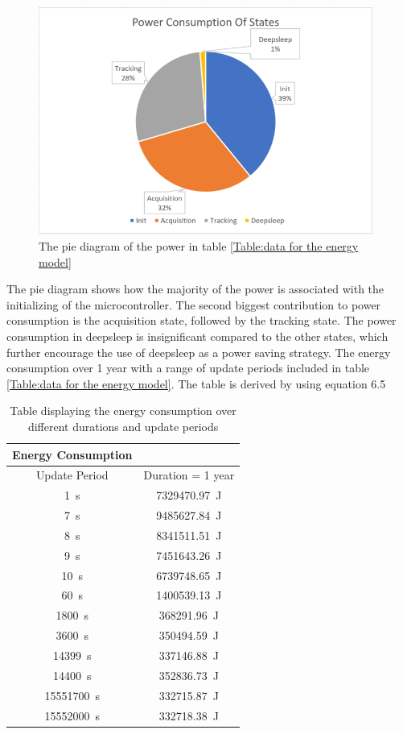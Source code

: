 \begin{figure}[H]
\centering
\includegraphics[height=7.5cm]{Project_Report/Images/Power.PNG}
\caption{The pie diagram of the power in table \ref{Table:data for the energy model}}
\label{fig:powerconsumption}
\end{figure}

The pie diagram shows how the majority of the power is associated with the initializing of the microcontroller. The second biggest contribution to power consumption is the acquisition state, followed by the tracking state. The power consumption in deepsleep is insignificant compared to the other states, which further encourage the use of deepsleep as a power saving strategy. The energy consumption over 1 year with a range of update periods included in table \ref{Table:data for the energy model}. The table is derived by using equation 6.5


\begin{table}[h!]
\begin{center}
 \begin{tabular}{||c c||} 
 \hline
 Energy Consumption & \\
 \hline
  Update Period & Duration = 1 year \\[0.5ex] 
 \hline\hline
  1 \,s & 7329470.97 \,J \\ 
 \hline
  7 \,s & 9485627.84 \,J \\
  \hline
  8 \,s & 8341511.51 \,J \\
  \hline
  9 \,s & 7451643.26 \,J \\
  \hline
  10 \,s & 6739748.65 \,J \\
 \hline
  60 \,s & 1400539.13 \,J \\
 \hline
  1800 \,s & 368291.96 \,J \\
  \hline
  3600 \,s & 350494.59 \,J \\
  \hline
  14399 \,s & 337146.88 \,J \\
  \hline
  14400 \,s & 352836.73 \,J \\
  \hline
  15551700 \,s & 332715.87 \,J \\
  \hline
  15552000 \,s & 332718.38 \,J \\[1ex]
 \hline
\end{tabular}
\end{center}
\caption{Table displaying the energy consumption over different durations and update periods}
\label{Table:energy}
\end{table}


